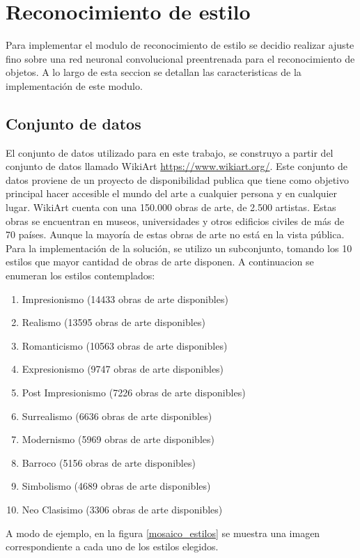 \documentclass[a4paper,11pt,spanish]{book}
\begin{document}
\section{Reconocimiento de estilo}
  Para implementar el modulo de reconocimiento de estilo se decidio realizar ajuste fino sobre una red neuronal convolucional preentrenada para el reconocimiento de objetos.
  A lo largo de esta seccion se detallan las caracteristicas de la implementación de este modulo.
  \subsection{Conjunto de datos}
    El conjunto de datos utilizado para en este trabajo, se construyo a partir del conjunto de datos llamado WikiArt \url{https://www.wikiart.org/}.
    Este conjunto de datos proviene de un proyecto de disponibilidad publica que tiene como objetivo principal hacer accesible el mundo del arte a cualquier persona y en cualquier lugar.
    WikiArt cuenta con una 150.000 obras de arte, de 2.500 artistas. Estas obras se encuentran en museos, universidades y otros edificios civiles de más de 70 países. Aunque la mayoría de estas obras de arte no está en la vista pública.
    Para la implementación de la solución, se utilizo un subconjunto, tomando los 10 estilos que mayor cantidad de obras de arte disponen. A continuacion se enumeran los estilos contemplados:
    \begin{enumerate}
      \item Impresionismo  (14433 obras de arte disponibles)
      \item Realismo (13595 obras de arte disponibles)
      \item Romanticismo (10563 obras de arte disponibles)
      \item Expresionismo (9747 obras de arte disponibles)
      \item Post Impresionismo (7226 obras de arte disponibles)
      \item Surrealismo (6636 obras de arte disponibles)
      \item Modernismo (5969 obras de arte disponibles)
      \item Barroco (5156 obras de arte disponibles)
      \item Simbolismo (4689 obras de arte disponibles)
      \item Neo Clasisimo (3306 obras de arte disponibles)
    \end{enumerate}
      A modo de ejemplo, en la figura \ref{mosaico_estilos} se muestra una imagen correspondiente a cada uno de los estilos elegidos.
\end{document}
